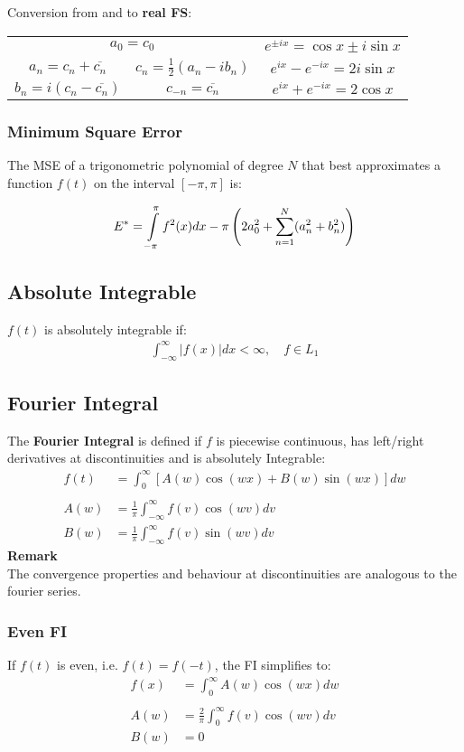 Conversion from and to \textbf{real FS}:\\
\begin{tabular}[h]{c|c|c} %
    \multicolumn{2}{c}{$a_0=c_0$} & $e^{\pm ix}=\cos x\pm i\sin x$                             \\
    $a_n=c_n+\overline{c_n}$              & $c_n = \frac{1}{2}(a_n-ib_n)$  & $e^{ix}-e^{-ix}=2i\sin x$ \\
    $b_n=i(c_n-\overline{c_n})$   & $c_{-n}=\overline{c_n}$        & $e^{ix}+e^{-ix}=2\cos x$
\end{tabular}

\subsubsection{Minimum Square Error}
The MSE of a trigonometric polynomial of degree $N$ that best approximates a function $f(t)$ on the interval $[-\pi,\pi]$ is:

\begin{align*}
    E^*=\intop_{-\pi}^\pi f^2(x)dx-\pi\left(2a_0^2+\sum_{n=1}^N(a_n^2+b_n^2)\right)
\end{align*}

\subsection{Absolute Integrable}
$f(t)$ is absolutely integrable if:
\begin{align*}
    \int_{-\infty}^{\infty}\left|f(x)\right|dx<\infty ,\quad f\in L_1
\end{align*}
\subsection{Fourier Integral}
The \textbf{Fourier Integral} is defined if $f$ is piecewise continuous, has left/right derivatives at
discontinuities and is absolutely Integrable:
\begin{align*}
    f(t) & =\int_0^\infty[A(w)\cos(wx)+B(w)\sin(wx)]dw     \\\\
    A(w) & =\frac1\pi\int_{-\infty}^{\infty}f(v)\cos(wv)dv \\
    B(w) & =\frac1\pi\int_{-\infty}^{\infty}f(v)\sin(wv)dv
\end{align*}
\textbf{Remark}\\
The convergence properties and behaviour at discontinuities are analogous to the fourier series.
\subsubsection{Even FI}
If $f(t)$ is even, i.e. $f(t)=f(-t)$, the FI simplifies to:
\begin{align*}
    f(x) & =\int_0^\infty A(w)\cos(wx)dw          \\\\
    A(w) & =\frac2\pi\int_0^\infty f(v)\cos(wv)dv \\
    B(w) & =0
\end{align*}
